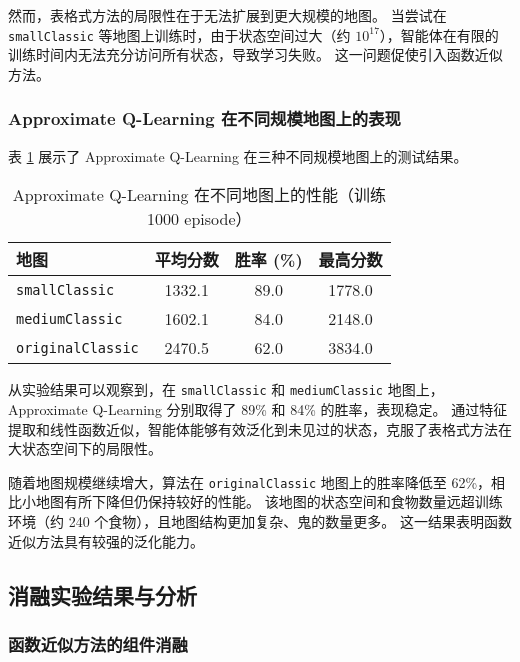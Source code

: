 然而，表格式方法的局限性在于无法扩展到更大规模的地图。
当尝试在 \texttt{smallClassic} 等地图上训练时，由于状态空间过大（约 $10^{17}$），智能体在有限的训练时间内无法充分访问所有状态，导致学习失败。
这一问题促使引入函数近似方法。

\subsubsection{Approximate Q-Learning 在不同规模地图上的表现}

表 \ref{tab:approx_q_performance} 展示了 Approximate Q-Learning 在三种不同规模地图上的测试结果。

\begin{table}[h]
    \renewcommand{\arraystretch}{1.5}
    \setlength{\tabcolsep}{10pt}
    \centering
    \caption{Approximate Q-Learning 在不同地图上的性能（训练 1000 episode）}
    \small
    \begin{tabular}{lccc}
        \toprule
        \textbf{地图} & \textbf{平均分数} & \textbf{胜率 (\%)} & \textbf{最高分数} \\
        \midrule
        \texttt{smallClassic} & 1332.1 & 89.0 & 1778.0 \\
        \texttt{mediumClassic} & 1602.1 & 84.0 & 2148.0 \\
        \texttt{originalClassic} & 2470.5 & 62.0 & 3834.0 \\
        \bottomrule
    \end{tabular}
    \label{tab:approx_q_performance}
\end{table}

从实验结果可以观察到，在 \texttt{smallClassic} 和 \texttt{mediumClassic} 地图上，Approximate Q-Learning 分别取得了 89\% 和 84\% 的胜率，表现稳定。
通过特征提取和线性函数近似，智能体能够有效泛化到未见过的状态，克服了表格式方法在大状态空间下的局限性。

随着地图规模继续增大，算法在 \texttt{originalClassic} 地图上的胜率降低至 62\%，相比小地图有所下降但仍保持较好的性能。
该地图的状态空间和食物数量远超训练环境（约 240 个食物），且地图结构更加复杂、鬼的数量更多。
这一结果表明函数近似方法具有较强的泛化能力。


\subsection{消融实验结果与分析}

\subsubsection{函数近似方法的组件消融}


